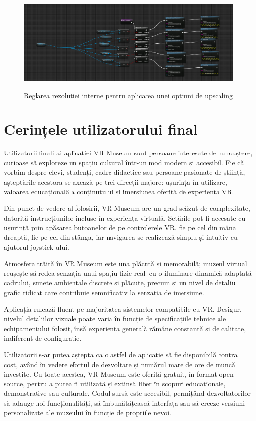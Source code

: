 \begin{figure} [htp] 
\centering 
\includegraphics [width=14cm]
{continut/capitol3/figuri/DLSS_Quality.png} 
\label{fig:Menu}  
    \caption{Reglarea rezoluției interne pentru aplicarea unei opțiuni de upscaling}
\end{figure}
\newpage




\section{Cerințele utilizatorului final}

Utilizatorii finali ai aplicației VR Museum sunt persoane interesate de cunoaștere, curioase să exploreze un spațiu cultural într-un mod modern și accesibil. Fie că vorbim despre elevi, studenți, cadre didactice sau persoane pasionate de știință, așteptările acestora se axează pe trei direcții majore: ușurința în utilizare, valoarea educațională a conținutului și imersiunea oferită de experiența VR.

Din punct de vedere al folosirii, VR Museum are un grad scăzut de complexitate, datorită instrucțiunilor incluse în experiența virtuală. Setările pot fi accesate cu ușurință prin apăsarea butoanelor de pe controlerele VR, fie pe cel din mâna dreaptă, fie pe cel din stânga, iar navigarea se realizează simplu și intuitiv cu ajutorul joystick-ului.

Atmosfera trăită în VR Museum este una plăcută și memorabilă; muzeul virtual reușește să redea senzația unui spațiu fizic real, cu o iluminare dinamică adaptată cadrului, sunete ambientale discrete și plăcute, precum și un nivel de detaliu grafic ridicat care contribuie semnificativ la senzația de imersiune.

Aplicația rulează fluent pe majoritatea sistemelor compatibile cu VR. Desigur, nivelul detaliilor vizuale poate varia în funcție de specificațiile tehnice ale echipamentului folosit, însă experiența generală rămâne constantă și de calitate, indiferent de configurație.

Utilizatorii s-ar putea aștepta ca o astfel de aplicație să fie disponibilă contra cost, având în vedere efortul de dezvoltare și numărul mare de ore de muncă investite. Cu toate acestea, VR Museum este oferită gratuit, în format open-source, pentru a putea fi utilizată și extinsă liber în scopuri educaționale, demonstrative sau culturale. Codul sursă este accesibil, permițând dezvoltatorilor să adauge noi funcționalități, să îmbunătățească interfața sau să creeze versiuni personalizate ale muzeului în funcție de propriile nevoi.